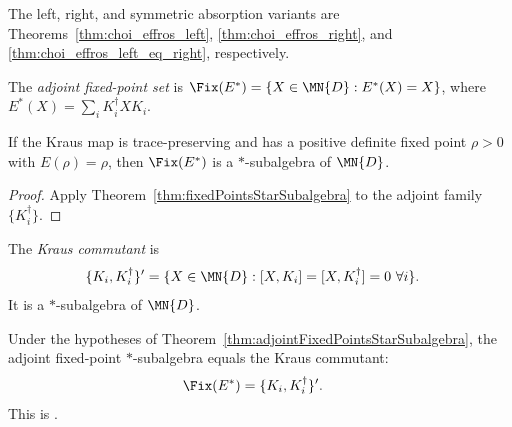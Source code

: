 The left, right, and symmetric absorption variants are
Theorems~\ref{thm:choi_effros_left}, \ref{thm:choi_effros_right}, and
\ref{thm:choi_effros_left_eq_right}, respectively.

\begin{definition}\label{def:adjoint_fixed_points}
    \leanok
    The \emph{adjoint fixed-point set} is
    $\Fix(E^*)=\{X\in\MN{D}:E^*(X)=X\}$, where
    $E^*(X)=\sum_iK_i^\dagger XK_i$.
\end{definition}

\begin{theorem}
    \label{thm:adjointFixedPointsStarSubalgebra}
    \leanok
    If the Kraus map is trace-preserving and has a positive definite
    fixed point $\rho>0$ with $E(\rho)=\rho$, then $\Fix(E^*)$ is a
    $*$-subalgebra of $\MN{D}$.
\end{theorem}

\begin{proof}\leanok
    Apply Theorem~\ref{thm:fixedPointsStarSubalgebra} to the adjoint
    family $\{K_i^\dagger\}$.
\end{proof}

\begin{definition}\label{def:kraus_commutant}
    \leanok
    The \emph{Kraus commutant} is
    \begin{align}
        \{K_i,K_i^\dagger\}'
         & =\{X\in\MN{D}:[X,K_i]=[X,K_i^\dagger]=0\ \forall i\}.
        \label{eq:channel_kraus_commutant}
    \end{align}
    It is a $*$-subalgebra of $\MN{D}$.
\end{definition}

\begin{theorem}
    \label{thm:adjointFixedPoints_eq_krausCommutant}
    \leanok
    Under the hypotheses of Theorem~\ref{thm:adjointFixedPointsStarSubalgebra},
    the adjoint fixed-point $*$-subalgebra equals the Kraus commutant:
    \begin{align}
        \Fix(E^*)
         & =\{K_i,K_i^\dagger\}'.
        \label{eq:channel_adjoint_fix_commutant}
    \end{align}
    This is \cite[Theorem~6.13]{Wolf2012Quantum}.
\end{theorem}

